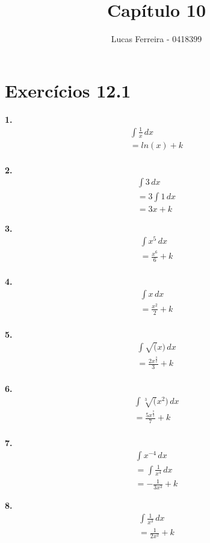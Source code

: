 \documentclass{article}
\title{Capítulo 10}
\author{Lucas Ferreira - 0418399}
\date{}
\begin{document}
\maketitle


\section{Exercícios 12.1}
\textbf{1.}
\begin{gather*}
    \int \frac{1}{x}\,dx
\\
    = ln(x) + k
\\
\end{gather*}

\textbf{2.}
\begin{gather*}
    \int 3\,dx
\\
    = 3\int 1\,dx
\\
    = 3x + k
\end{gather*}

\textbf{3.}
\begin{gather*}
    \int x^5\,dx
\\
    = \frac{x^6}{6} + k
\\
\end{gather*}

\textbf{4.}
\begin{gather*}
    \int x\,dx
\\
    = \frac{x^2}{2} + k
\\
\end{gather*}

\textbf{5.}
\begin{gather*}
    \int \sqrt(x) \,dx
\\
    = \frac{2x^{\frac{3}{2}}}{3} + k
\\
\end{gather*}

\textbf{6.}
\begin{gather*}
    \int \sqrt[3](x^2) \,dx
\\
    = \frac{5x^{\frac{7}{3}}}{7} + k
\\
\end{gather*}

\textbf{7.}
\begin{gather*}
    \int x^{-4} \,dx
\\
    = \int \frac{1}{x^4} \,dx
\\
    = -\frac{1}{3x^3} + k
\end{gather*}

\textbf{8.}
\begin{gather*}
    \int \frac{1}{x^3} \,dx
\\
    = \frac{1}{2x^2} + k
\\
\end{gather*}
\end{document}
